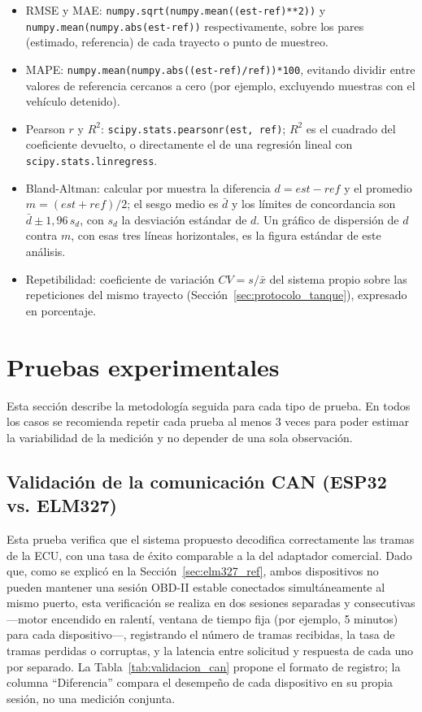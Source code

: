 \begin{itemize}
	\item RMSE y MAE: \texttt{numpy.sqrt(numpy.mean((est-ref)**2))} y \texttt{numpy.mean(numpy.abs(est-ref))} respectivamente, sobre los pares (estimado, referencia) de cada trayecto o punto de muestreo.
	\item MAPE: \texttt{numpy.mean(numpy.abs((est-ref)/ref))*100}, evitando dividir entre valores de referencia cercanos a cero (por ejemplo, excluyendo muestras con el vehículo detenido).
	\item Pearson $r$ y $R^2$: \texttt{scipy.stats.pearsonr(est, ref)}; $R^2$ es el cuadrado del coeficiente devuelto, o directamente el de una regresión lineal con \texttt{scipy.stats.linregress}.
	\item Bland-Altman: calcular por muestra la diferencia $d = est - ref$ y el promedio $m = (est+ref)/2$; el sesgo medio es $\bar d$ y los límites de concordancia son $\bar d \pm 1{,}96\,s_d$, con $s_d$ la desviación estándar de $d$. Un gráfico de dispersión de $d$ contra $m$, con esas tres líneas horizontales, es la figura estándar de este análisis.
	\item Repetibilidad: coeficiente de variación $CV = s/\bar{x}$ del sistema propio sobre las repeticiones del mismo trayecto (Sección~\ref{sec:protocolo_tanque}), expresado en porcentaje.
\end{itemize}

\section{Pruebas experimentales}

Esta sección describe la metodología seguida para cada tipo de prueba. En todos los casos se recomienda repetir cada prueba al menos 3 veces para poder estimar la variabilidad de la medición y no depender de una sola observación.

\subsection{Validación de la comunicación CAN (ESP32 vs. ELM327)}

Esta prueba verifica que el sistema propuesto decodifica correctamente las tramas de la ECU, con una tasa de éxito comparable a la del adaptador comercial. Dado que, como se explicó en la Sección~\ref{sec:elm327_ref}, ambos dispositivos no pueden mantener una sesión OBD-II estable conectados simultáneamente al mismo puerto, esta verificación se realiza en dos sesiones separadas y consecutivas —motor encendido en ralentí, ventana de tiempo fija (por ejemplo, 5 minutos) para cada dispositivo—, registrando el número de tramas recibidas, la tasa de tramas perdidas o corruptas, y la latencia entre solicitud y respuesta de cada uno por separado. La Tabla~\ref{tab:validacion_can} propone el formato de registro; la columna ``Diferencia'' compara el desempeño de cada dispositivo en su propia sesión, no una medición conjunta.

